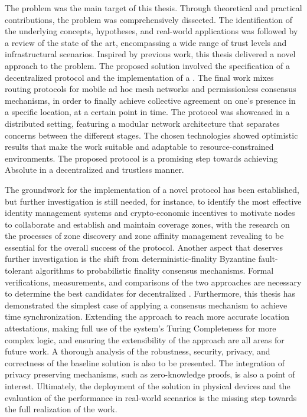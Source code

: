 The \pol{} problem was the main target of this thesis. Through theoretical and practical contributions, the problem was comprehensively dissected. The identification of the underlying concepts, hypotheses, and real-world applications was followed by a review of the state of the art, encompassing a wide range of trust levels and infrastructural scenarios. Inspired by previous work, this thesis delivered a novel approach to the problem. The proposed solution involved the specification of a decentralized \pol{} protocol and the implementation of a \poc{}. The final work mixes routing protocols for mobile ad hoc mesh networks and permissionless consensus mechanisms, in order to finally achieve collective agreement on one's presence in a specific location, at a certain point in time. The protocol was showcased in a distributed setting, featuring a modular network architecture that separates concerns between the different stages. The chosen technologies showed optimistic results that make the work suitable and adaptable to resource-constrained environments. The proposed protocol is a promising step towards achieving Absolute \pol{} in a decentralized and trustless manner.

The groundwork for the implementation of a novel \pol{} protocol has been established, but further investigation is still needed, for instance, to identify the most effective identity management systems and crypto-economic incentives to motivate nodes to collaborate and establish and maintain coverage zones, with the research on the processes of zone discovery and zone affinity management revealing to be essential for the overall success of the protocol. Another aspect that deserves further investigation is the shift from deterministic-finality Byzantine fault-tolerant algorithms to probabilistic finality consensus mechanisms. Formal verifications, measurements, and comparisons of the two approaches are necessary to determine the best candidates for decentralized \pol{}. Furthermore, this thesis has demonstrated the simplest case of applying a consensus mechanism to achieve time synchronization. Extending the approach to reach more accurate location attestations, making full use of the system's Turing Completeness for more complex logic, and ensuring the extensibility of the approach are all areas for future work. A thorough analysis of the robustness, security, privacy, and correctness of the baseline solution is also to be presented. The integration of privacy preserving mechanisms, such as zero-knowledge proofs, is also a point of interest. Ultimately, the deployment of the solution in physical devices and the evaluation of the performance in real-world scenarios is the missing step towards the full realization of the work.

